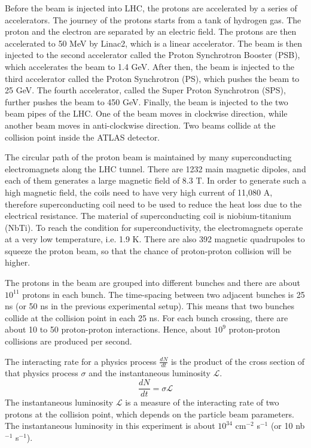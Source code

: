Before the beam is injected into LHC, the protons are accelerated by a series of accelerators.
The journey of the protons starts from a tank of hydrogen gas.
The proton and the electron are separated by an electric field.
The protons are then accelerated to 50 MeV by Linac2, which is a linear accelerator.
The beam is then injected to the second accelerator called the Proton Synchrotron Booster (PSB), which accelerates the beam to 1.4 GeV.
After then, the beam is injected to the third accelerator called the Proton Synchrotron (PS), which pushes the beam to 25 GeV.
The fourth accelerator, called the Super Proton Synchrotron (SPS), further pushes the beam to 450 GeV.
Finally, the beam is injected to the two beam pipes of the LHC.
One of the beam moves in clockwise direction, while another beam moves in anti-clockwise direction.
Two beams collide at the collision point inside the ATLAS detector.
\cite{accelerator}

The circular path of the proton beam is maintained by many superconducting electromagnets along the LHC tunnel.
There are 1232 main magnetic dipoles, and each of them generates a large magnetic field of 8.3 T.
In order to generate such a high magnetic field, the coils need to have very high current of 11,080 A, therefore superconducting coil need to be used to reduce the heat loss due to the electrical resistance.
The material of superconducting coil is niobium-titanium (NbTi).
To reach the condition for superconductivity, the electromagnets operate at a very low temperature, i.e. 1.9 K.
There are also 392 magnetic quadrupoles to squeeze the proton beam, so that the chance of proton-proton collision will be higher.
\cite{supermagnet,cryogenics}

The protons in the beam are grouped into different bunches and there are about $10^{11}$ protons in each bunch.
The time-spacing between two adjacent bunches is 25 ns (or 50 ns in the previous experimental setup).
This means that two bunches collide at the collision point in each 25 ns.
For each bunch crossing, there are about 10 to 50 proton-proton interactions.
Hence, about $10^9$ proton-proton collisions are produced per second.

The interacting rate for a physics process $\frac{dN}{dt}$ is the product of the cross section of that physics process $\sigma$ and the instantaneous luminosity $\mathcal{L}$.
\begin{equation}
\frac{dN}{dt} = \sigma \mathcal{L}
\end{equation}
The instantaneous luminosity $\mathcal{L}$ is a measure of the interacting rate of two protons at the collision point, which depends on the particle beam parameters.
The instantaneous luminosity in this experiment is about $10^{34}$ cm$^{-2}$ s$^{-1}$ (or 10 nb$^{-1}$ s$^{-1}$).

